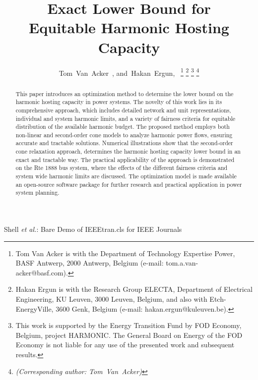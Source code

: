 \documentclass[journal]{IEEEtran}
\begin{document}
\title{Exact Lower Bound for \\ Equitable Harmonic Hosting Capacity}
\author{Tom~Van~Acker~,%
        and~Hakan~Ergun,~%
\thanks{Tom Van Acker is with the Department of Technology Expertise Power, BASF Antwerp, 2000 Antwerp, Belgium (e-mail: tom.a.van-acker@basf.com).}%
\thanks{Hakan Ergun is with the Research Group ELECTA, Department of Electrical Engineering, KU Leuven, 3000 Leuven, Belgium, and also with Etch-EnergyVille, 3600 Genk, Belgium (e-mail: hakan.ergun@kuleuven.be).}
\thanks{This work is supported by the Energy Transition Fund by FOD Economy, Belgium, project HARMONIC. The General Board on Energy of the FOD Economy is not liable for any use of the presented work and subsequent results.}
\thanks{\textit{(Corresponding author: Tom~Van~Acker)}}}

%
{Shell \MakeLowercase{\textit{et al.}}: Bare Demo of IEEEtran.cls for IEEE Journals}

\maketitle

\begin{abstract}
This paper introduces an optimization method to determine the lower bound on the harmonic hosting capacity in power systems. The novelty of this work lies in its comprehensive approach, which includes detailed network and unit representations, individual and system harmonic limits, and a variety of fairness criteria for equitable distribution of the available harmonic budget. The proposed method employs both non-linear and second-order cone models to analyze harmonic power flows, ensuring accurate and tractable solutions. Numerical illustrations show that the second-order cone relaxation approach, determines the harmonic hosting capacity lower bound in an exact and tractable way. The practical applicability of the approach is demonstrated on the Rte 1888 bus system, where the effects of the different fairness criteria and system wide harmonic limits are discussed. The optimization model is made available an open-source software package for further research and practical application in power system planning.
\end{abstract}
\end{document}

